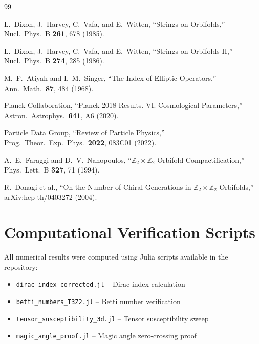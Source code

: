\documentclass[12pt,a4paper]{article}
\newcommand{\Ztwo}{\mathbb{Z}_2}
\begin{document}
\begin{thebibliography}{99}

 L.~Dixon, J.~Harvey, C.~Vafa, and E.~Witten,
``Strings on Orbifolds,''
Nucl.\ Phys.\ B \textbf{261}, 678 (1985).

 L.~Dixon, J.~Harvey, C.~Vafa, and E.~Witten,
``Strings on Orbifolds II,''
Nucl.\ Phys.\ B \textbf{274}, 285 (1986).

 M.~F.~Atiyah and I.~M.~Singer,
``The Index of Elliptic Operators,''
Ann.\ Math.\ \textbf{87}, 484 (1968).

 Planck Collaboration,
``Planck 2018 Results. VI. Cosmological Parameters,''
Astron.\ Astrophys.\ \textbf{641}, A6 (2020).

 Particle Data Group,
``Review of Particle Physics,''
Prog.\ Theor.\ Exp.\ Phys.\ \textbf{2022}, 083C01 (2022).

 A.~E.~Faraggi and D.~V.~Nanopoulos,
``$\Ztwo \times \Ztwo$ Orbifold Compactification,''
Phys.\ Lett.\ B \textbf{327}, 71 (1994).

 R.~Donagi et al.,
``On the Number of Chiral Generations in $\Ztwo \times \Ztwo$ Orbifolds,''
arXiv:hep-th/0403272 (2004).

\end{thebibliography}

\appendix

\section{Computational Verification Scripts}

All numerical results were computed using Julia scripts available in the repository:

\begin{itemize}
    \item \texttt{dirac\_index\_corrected.jl} -- Dirac index calculation
    \item \texttt{betti\_numbers\_T3Z2.jl} -- Betti number verification
    \item \texttt{tensor\_susceptibility\_3d.jl} -- Tensor susceptibility sweep
    \item \texttt{magic\_angle\_proof.jl} -- Magic angle zero-crossing proof
\end{itemize}
\end{document}
